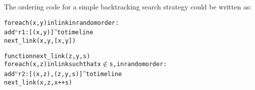 The ordering code for a simple backtracking search strategy could be written as:

\begin{alltt}
for each (x,y) in link in random order:
   add ``r1: [(x,y)]'' to timeline
   next_link(x,y,[x,y])

function next_link(z,y,s)
   for each (x,z) in link such that x \(\not\in\) s, in random order:
      add ``r2: [(x,z), (z,y,s)]'' to timeline
      next_link(x,z,x ++ s)
\end{alltt}

